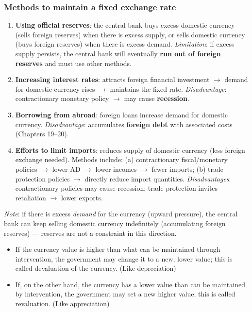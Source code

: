 \documentclass[a4paper,12pt]{article}
\begin{document}
\subsubsection*{Methods to maintain a fixed exchange rate}
\begin{enumerate}
  \item \textbf{Using official reserves}: the central bank buys excess domestic currency (sells foreign reserves) when there is excess supply, or sells domestic currency (buys foreign reserves) when there is excess demand. \textit{Limitation}: if excess supply persists, the central bank will eventually \textbf{run out of foreign reserves} and must use other methods.
  \item \textbf{Increasing interest rates}: attracts foreign financial investment $\to$ demand for domestic currency rises $\to$ maintains the fixed rate. \textit{Disadvantage}: contractionary monetary policy $\to$ may cause \textbf{recession}.
  \item \textbf{Borrowing from abroad}: foreign loans increase demand for domestic currency. \textit{Disadvantage}: accumulates \textbf{foreign debt} with associated costs (Chapters 19--20).
  \item \textbf{Efforts to limit imports}: reduces supply of domestic currency (less foreign exchange needed). Methods include: (a) contractionary fiscal/monetary policies $\to$ lower AD $\to$ lower incomes $\to$ fewer imports; (b) trade protection policies $\to$ directly reduce import quantities. \textit{Disadvantages}: contractionary policies may cause recession; trade protection invites retaliation $\to$ lower exports.
\end{enumerate}
\textit{Note}: if there is excess \textit{demand} for the currency (upward pressure), the central bank can keep selling domestic currency indefinitely (accumulating foreign reserves) --- reserves are not a constraint in this direction.
\begin{itemize}
  \item If the currency value is higher than what can be maintained through intervention, the government may change it to a new, lower value; this is called devaluation of the currency. (Like depreciation)
  \item If, on the other hand, the currency has a lower value than can be maintained by intervention, the government may set a new higher value; this is called revaluation. (Like appreciation)
\end{itemize}
\end{document}
